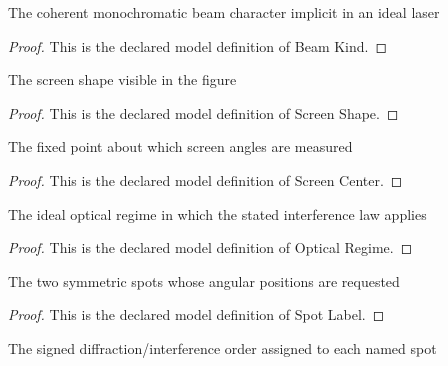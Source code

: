 \begin{definition}
  \label{def:physics:phyx-mini-0124:phyxminiproblems-problemphyxmini0124-beamkind}
  The coherent monochromatic beam character implicit in an ideal laser
\end{definition}
\begin{proof}
  This is the declared model definition of Beam Kind.
\end{proof}
\begin{definition}
  \label{def:physics:phyx-mini-0124:phyxminiproblems-problemphyxmini0124-screenshape}
  The screen shape visible in the figure
\end{definition}
\begin{proof}
  This is the declared model definition of Screen Shape.
\end{proof}
\begin{definition}
  \label{def:physics:phyx-mini-0124:phyxminiproblems-problemphyxmini0124-screencenter}
  The fixed point about which screen angles are measured
\end{definition}
\begin{proof}
  This is the declared model definition of Screen Center.
\end{proof}
\begin{definition}
  \label{def:physics:phyx-mini-0124:phyxminiproblems-problemphyxmini0124-opticalregime}
  The ideal optical regime in which the stated interference law applies
\end{definition}
\begin{proof}
  This is the declared model definition of Optical Regime.
\end{proof}
\begin{definition}
  \label{def:physics:phyx-mini-0124:phyxminiproblems-problemphyxmini0124-spotlabel}
  The two symmetric spots whose angular positions are requested
\end{definition}
\begin{proof}
  This is the declared model definition of Spot Label.
\end{proof}
\begin{definition}
  \label{def:physics:phyx-mini-0124:phyxminiproblems-problemphyxmini0124-spotorder}
  The signed diffraction/interference order assigned to each named spot
\end{definition}

